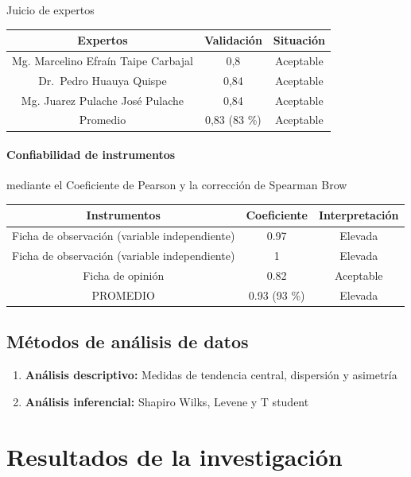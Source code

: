 \documentclass[12pt,]{report}
\begin{document}
Juicio de expertos

\begin{longtable}[]{@{}ccc@{}}
\toprule
Expertos & Validación & Situación\tabularnewline
\midrule
\endhead
Mg. Marcelino Efraín Taipe Carbajal & 0,8 & Aceptable\tabularnewline
Dr.~Pedro Huauya Quispe & 0,84 & Aceptable\tabularnewline
Mg. Juarez Pulache José Pulache & 0,84 & Aceptable\tabularnewline
Promedio & 0,83 (83 \%) & Aceptable\tabularnewline
\bottomrule
\end{longtable}

\hypertarget{confiabilidad-de-instrumentos}{%
\subsubsection{Confiabilidad de instrumentos}\label{confiabilidad-de-instrumentos}}

mediante el Coeficiente de Pearson
y la corrección de Spearman Brow

\begin{longtable}[]{@{}ccc@{}}
\toprule
Instrumentos & Coeficiente & Interpretación\tabularnewline
\midrule
\endhead
Ficha de observación (variable independiente) & 0.97 & Elevada\tabularnewline
Ficha de observación (variable independiente) & 1 & Elevada\tabularnewline
Ficha de opinión & 0.82 & Aceptable\tabularnewline
PROMEDIO & 0.93 (93 \%) & Elevada\tabularnewline
\bottomrule
\end{longtable}

\hypertarget{muxe9todos-de-anuxe1lisis-de-datos}{%
\section{Métodos de análisis de datos}\label{muxe9todos-de-anuxe1lisis-de-datos}}

\begin{enumerate}
\def\labelenumi{\arabic{enumi}.}
\item
  \textbf{Análisis descriptivo: } Medidas de tendencia central, dispersión y asimetría
\item
  \textbf{Análisis inferencial:} Shapiro Wilks, Levene y T student \citep{surhone2010shapiro}
\end{enumerate}

\hypertarget{resultados-de-la-investigaciuxf3n}{%
\chapter{Resultados de la investigación}\label{resultados-de-la-investigaciuxf3n}}
\end{document}
